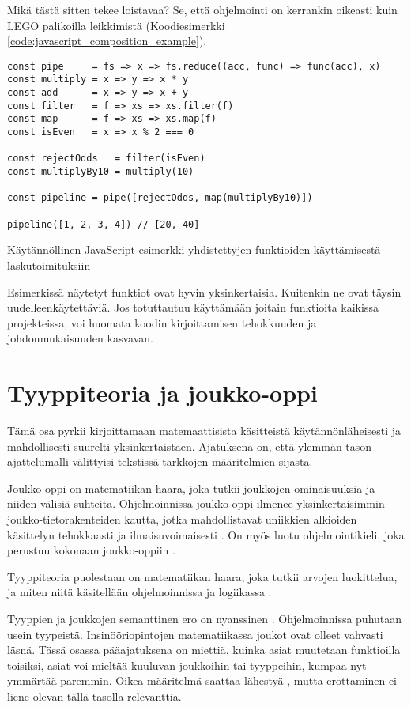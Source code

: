 Mikä tästä sitten tekee loistavaa? Se, että ohjelmointi on kerrankin oikeasti kuin LEGO palikoilla leikkimistä (Koodiesimerkki \ref{code:javascript_composition_example}).

\begin{code}
    \begin{verbatim}
const pipe     = fs => x => fs.reduce((acc, func) => func(acc), x)
const multiply = x => y => x * y
const add      = x => y => x + y
const filter   = f => xs => xs.filter(f)
const map      = f => xs => xs.map(f)
const isEven   = x => x % 2 === 0

const rejectOdds   = filter(isEven)
const multiplyBy10 = multiply(10)

const pipeline = pipe([rejectOdds, map(multiplyBy10)])

pipeline([1, 2, 3, 4]) // [20, 40]
\end{verbatim}
    \caption{Käytännöllinen JavaScript-esimerkki yhdistettyjen funktioiden käyttämisestä laskutoimituksiin}
    \label{code:javascript_composition_example}
\end{code}

Esimerkissä näytetyt funktiot ovat hyvin yksinkertaisia. Kuitenkin ne ovat täysin uudelleenkäytettäviä. Jos totuttautuu käyttämään joitain funktioita kaikissa projekteissa, voi huomata koodin kirjoittamisen tehokkuuden ja johdonmukaisuuden kasvavan.

\section{Tyyppiteoria ja joukko-oppi}
Tämä osa pyrkii kirjoittamaan matemaattisista käsitteistä käytännönläheisesti ja mahdollisesti suurelti yksinkertaistaen. Ajatuksena on, että ylemmän tason ajattelumalli välittyisi tekstissä tarkkojen määritelmien sijasta.

Joukko-oppi on matematiikan haara, joka tutkii joukkojen ominaisuuksia ja niiden välisiä suhteita. Ohjelmoinnissa joukko-oppi ilmenee yksinkertaisimmin joukko-tietorakenteiden kautta, jotka mahdollistavat uniikkien alkioiden käsittelyn tehokkaasti ja ilmaisuvoimaisesti \cite{mdn_set,mdn_set_methods}. On myös luotu ohjelmointikieli, joka perustuu kokonaan joukko-oppiin \cite{SETL_SET_LANGUAGE}.

Tyyppiteoria puolestaan on matematiikan haara, joka tutkii arvojen luokittelua, ja miten niitä käsitellään ohjelmoinnissa ja logiikassa \cite{type_theory,algebraic_data_types}.

Tyyppien ja joukkojen semanttinen ero on nyanssinen \cite{type_vs_set}. Ohjelmoinnissa puhutaan usein tyypeistä. Insinööriopintojen matematiikassa joukot ovat olleet vahvasti läsnä. Tässä osassa pääajatuksena on miettiä, kuinka asiat muutetaan funktioilla toisiksi, asiat voi mieltää kuuluvan joukkoihin tai tyyppeihin, kumpaa nyt ymmärtää paremmin. Oikea määritelmä saattaa lähestyä , mutta erottaminen ei liene olevan tällä tasolla relevanttia.

